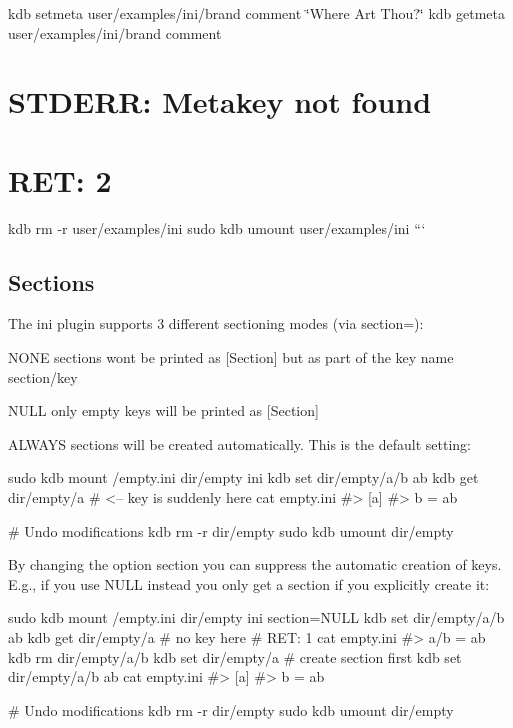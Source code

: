 kdb setmeta user/examples/ini/brand comment \char`\"{}\+Where Art Thou?\char`\"{} kdb getmeta user/examples/ini/brand comment \section*{S\+T\+D\+E\+RR\+: Metakey not found}

\section*{R\+ET\+: 2}

kdb rm -\/r user/examples/ini sudo kdb umount user/examples/ini ```

\subsection*{Sections}

The ini plugin supports 3 different sectioning modes (via {\ttfamily section=})\+:


\begin{DoxyItemize}
\item {\ttfamily N\+O\+NE} sections wont be printed as {\ttfamily \mbox{[}Section\mbox{]}} but as part of the key name {\ttfamily section/key}
\item {\ttfamily N\+U\+LL} only empty keys will be printed as {\ttfamily \mbox{[}Section\mbox{]}}
\item {\ttfamily A\+L\+W\+A\+YS} sections will be created automatically. This is the default setting\+:
\end{DoxyItemize}


\begin{DoxyCode}
sudo kdb mount /empty.ini dir/empty ini
kdb set dir/empty/a/b ab
kdb get dir/empty/a       # <-- key is suddenly here
cat empty.ini
#> [a]
#> b = ab

# Undo modifications
kdb rm -r dir/empty
sudo kdb umount dir/empty
\end{DoxyCode}


By changing the option {\ttfamily section} you can suppress the automatic creation of keys. E.\+g., if you use {\ttfamily N\+U\+LL} instead you only get a section if you explicitly create it\+:


\begin{DoxyCode}
sudo kdb mount /empty.ini dir/empty ini section=NULL
kdb set dir/empty/a/b ab
kdb get dir/empty/a       # no key here
# RET: 1
cat empty.ini
#> a/b = ab
kdb rm dir/empty/a/b
kdb set dir/empty/a    # create section first
kdb set dir/empty/a/b ab
cat empty.ini
#> [a]
#> b = ab

# Undo modifications
kdb rm -r dir/empty
sudo kdb umount dir/empty
\end{DoxyCode}



